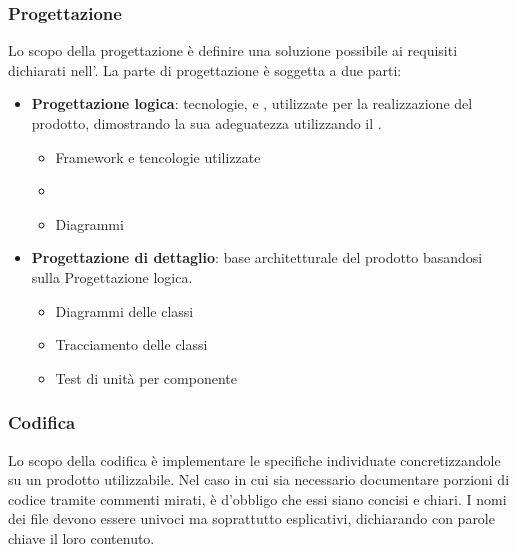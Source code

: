 \subsubsection{Progettazione}
Lo scopo della progettazione è definire una soluzione possibile ai requisiti dichiarati nell'.
La parte di progettazione è soggetta a due parti:
\begin{itemize}
    \item{\textbf{Progettazione logica}}: tecnologie,  e , utilizzate per la realizzazione del prodotto, dimostrando la sua adeguatezza utilizzando il .
    \begin{itemize}
        \item{Framework e tencologie utilizzate}
        \item{}
        \item{Diagrammi }
    \end{itemize}
    \item{\textbf{Progettazione di dettaglio}}: base architetturale del prodotto basandosi sulla Progettazione logica.
    \begin{itemize}
        \item{Diagrammi delle classi}
        \item{Tracciamento delle classi}
        \item{Test di unità per componente}
    \end{itemize}
\end{itemize}
\subsubsection{Codifica}
Lo scopo della codifica è implementare le specifiche individuate concretizzandole su un prodotto utilizzabile.
Nel caso in cui sia necessario documentare porzioni di codice tramite commenti mirati, è d'obbligo che essi siano concisi e chiari.
I nomi dei file devono essere univoci ma soprattutto esplicativi, dichiarando con parole chiave il loro contenuto.